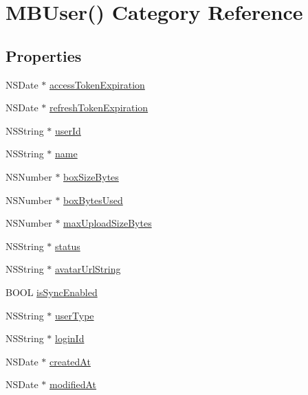 \hypertarget{category_m_b_user_07_08}{\section{M\-B\-User() Category Reference}
\label{category_m_b_user_07_08}
}
\subsection*{Properties}
\begin{DoxyCompactItemize}
\item 
N\-S\-Date $\ast$ \hyperlink{category_m_b_user_07_08_a66df6e37883628503b521d292bbe692b}{access\-Token\-Expiration}
\item 
N\-S\-Date $\ast$ \hyperlink{category_m_b_user_07_08_a73ea1a88a0ebe4f2fe0e71809784ebfd}{refresh\-Token\-Expiration}
\item 
N\-S\-String $\ast$ \hyperlink{category_m_b_user_07_08_a283433e5becee129a91a7edbce5f3380}{user\-Id}
\item 
N\-S\-String $\ast$ \hyperlink{category_m_b_user_07_08_afc8ccc6676addc3b49a494b2bf969c68}{name}
\item 
N\-S\-Number $\ast$ \hyperlink{category_m_b_user_07_08_aa03dfa57fb8b0fae8e391a60d77c9fc9}{box\-Size\-Bytes}
\item 
N\-S\-Number $\ast$ \hyperlink{category_m_b_user_07_08_a6a4749d925f5a1eeb3b286ed5303e540}{box\-Bytes\-Used}
\item 
N\-S\-Number $\ast$ \hyperlink{category_m_b_user_07_08_aa4a94c1c6e1dd4e50cdfd06f23657ef2}{max\-Upload\-Size\-Bytes}
\item 
N\-S\-String $\ast$ \hyperlink{category_m_b_user_07_08_a4a8dc3b7ee7453cb36548ab5c66baf72}{status}
\item 
N\-S\-String $\ast$ \hyperlink{category_m_b_user_07_08_a57a8fd5d5d911cc6d5845a80c689c95b}{avatar\-Url\-String}
\item 
B\-O\-O\-L \hyperlink{category_m_b_user_07_08_ad96023d6090470b8b69b65e4e82361d0}{is\-Sync\-Enabled}
\item 
N\-S\-String $\ast$ \hyperlink{category_m_b_user_07_08_a1cf94c9d11f80e81a86397d45539ee2c}{user\-Type}
\item 
N\-S\-String $\ast$ \hyperlink{category_m_b_user_07_08_aef87cc29a92dcb61b32d4df4b20e1eaa}{login\-Id}
\item 
N\-S\-Date $\ast$ \hyperlink{category_m_b_user_07_08_aa7512892f007799a179ce343a431f1e0}{created\-At}
\item 
N\-S\-Date $\ast$ \hyperlink{category_m_b_user_07_08_aa5b9bb3fc8bf7241c31847a009fa8544}{modified\-At}

\end{DoxyCompactItemize}
